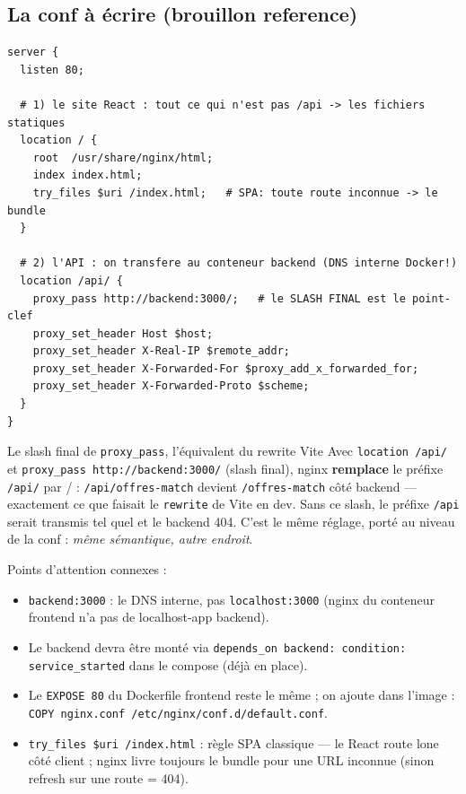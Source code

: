 \documentclass[11pt,a4paper]{article}
\begin{document}
\subsection{La conf à écrire (brouillon reference)}

\begin{lstlisting}[language=nginx]
server {
  listen 80;

  # 1) le site React : tout ce qui n'est pas /api -> les fichiers statiques
  location / {
    root  /usr/share/nginx/html;
    index index.html;
    try_files $uri /index.html;   # SPA: toute route inconnue -> le bundle
  }

  # 2) l'API : on transfere au conteneur backend (DNS interne Docker!)
  location /api/ {
    proxy_pass http://backend:3000/;   # le SLASH FINAL est le point-clef
    proxy_set_header Host $host;
    proxy_set_header X-Real-IP $remote_addr;
    proxy_set_header X-Forwarded-For $proxy_add_x_forwarded_for;
    proxy_set_header X-Forwarded-Proto $scheme;
  }
}
\end{lstlisting}

\begin{conceptbox}{Le slash final de \texttt{proxy\_pass}, l'équivalent du rewrite Vite}
Avec \texttt{location /api/} et \texttt{proxy\_pass http://backend:3000/}
(slash final), nginx \textbf{remplace} le préfixe \texttt{/api/} par / :
\texttt{/api/offres-match} devient \texttt{/offres-match} côté backend ---
exactement ce que faisait le \texttt{rewrite} de Vite en dev. Sans ce slash,
le préfixe \texttt{/api} serait transmis tel quel et le backend 404.
C'est le même réglage, porté au niveau de la conf : \emph{même sémantique, autre
endroit}.
\end{conceptbox}

Points d'attention connexes :
\begin{itemize}[nosep]
  \item \texttt{backend:3000} : le DNS interne, pas \texttt{localhost:3000}
        (nginx du conteneur frontend n'a pas de localhost-app backend).
  \item Le backend devra être monté via \texttt{depends\_on backend:
        condition: service\_started} dans le compose (déjà en place).
  \item Le \texttt{EXPOSE 80} du Dockerfile frontend reste le même ; on
        ajoute dans l'image : \texttt{COPY nginx.conf
        /etc/nginx/conf.d/default.conf}.
  \item \texttt{try\_files \$uri /index.html} : règle SPA classique --- le
        React route lone côté client ; nginx livre toujours le bundle pour
        une URL inconnue (sinon refresh sur une route = 404).
\end{itemize}
\end{document}
